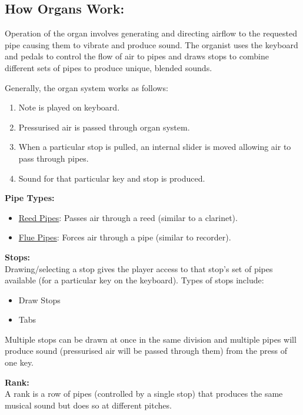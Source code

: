 \noindent \subsection{How Organs Work:}
\hspace{0.5cm} Operation of the organ involves generating and directing airflow to the requested pipe causing them to vibrate and produce sound. The organist uses the keyboard and pedals to control the flow of air to pipes and draws stops to combine different sets of pipes to produce unique, blended sounds.  \cite{organvideo}

\noindent Generally, the organ system works as follows:
\begin{enumerate}
    \itemsep0em 
\item Note is played on keyboard.
\item Pressurised air is passed through organ system.
\item When a particular stop is pulled, an internal slider is moved allowing air to pass through pipes.
\item Sound for that particular key and stop is produced.
\end{enumerate}

\noindent \textbf{Pipe Types:}
\begin{itemize}
    \itemsep0em 
\item \underline{Reed Pipes}: Passes air through a reed (similar to a clarinet).
\item \underline{Flue Pipes}: Forces air through a pipe (similar to recorder).
\end{itemize}
\cite{organvideo}

\noindent \textbf{Stops:}
\\ \hspace*{0.5cm}Drawing/selecting a stop gives the player access to that stop's set of pipes available (for a particular key on the keyboard). Types of stops include:
\begin{itemize}
    \itemsep0em 
\item Draw Stops
\item Tabs
\end{itemize}

Multiple stops can be drawn at once in the same division and multiple pipes will produce sound (pressurised air will be passed through them) from the press of one key. \cite{organvideo}

\medskip
\noindent \textbf{Rank:}
\\ \hspace*{0.5cm} A rank is a row of pipes (controlled by a single stop) that produces the same musical sound but does so at different pitches. 

